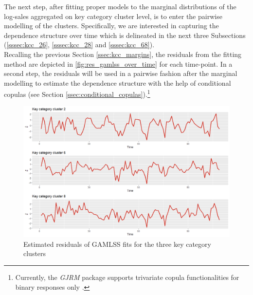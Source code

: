 
The next step, after fitting proper models to the marginal distributions of the log-sales aggregated on key category cluster level, is to enter the pairwise modelling of the clusters. Specifically, we are interested in capturing the dependence structure over time which is delineated in the next three Subsections (\ref{sssec:kcc_26}, \ref{sssec:kcc_28} and \ref{sssec:kcc_68}).
\\

Recalling the previous Section \ref{ssec:kcc_margins}, the residuals from the fitting method are depicted in \autoref{fig:res_gamlss_over_time} for each time-point. In a second step, the residuals will be used in a pairwise fashion after the marginal modelling to estimate the dependence structure with the help of conditional copulas (see Section \ref{ssec:conditional_copulas}).\footnote{Currently, the \textit{GJRM} package supports trivariate copula functionalities for binary responses only \citep{marragjrm}.}

\begin{figure}[H]
\centering
  \includegraphics[width=0.95\linewidth]{figures/res_gamlss_over_time.png}
  \caption{Estimated residuals of GAMLSS fits for the three key category clusters}
  \label{fig:res_gamlss_over_time}
\end{figure}









